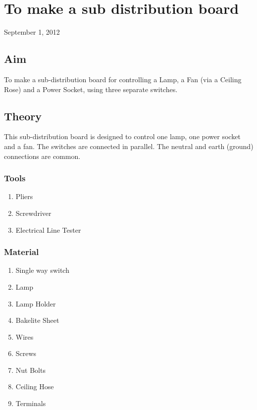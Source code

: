 \chapter{To make a sub distribution board}
\begin{flushright}
September 1, 2012
\end{flushright}
\section{Aim}
To make a sub-distribution board for controlling a Lamp, a Fan (via a Ceiling Rose) and a Power Socket, using three separate switches.

\section{Theory}
	This sub-distribution board is designed to control one lamp, one power socket and a fan. The switches are connected in parallel. The neutral and earth (ground) connections are common.
	\subsection {Tools}
		\begin{enumerate}
			\item Pliers
			\item Screwdriver
			\item Electrical Line Tester
		\end{enumerate}
	\subsection {Material}
		\begin{enumerate}
			\item Single way switch
			\item Lamp
			\item Lamp Holder
			\item Bakelite Sheet
			\item Wires
			\item Screws
			\item Nut Bolts
			\item Ceiling Hose
			\item Terminals
		\end{enumerate}
